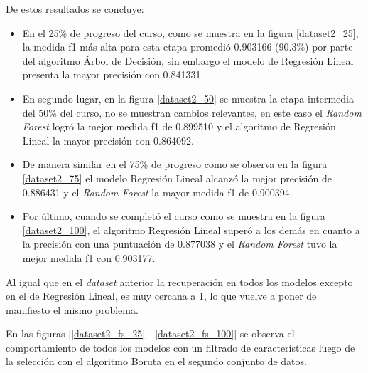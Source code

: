 De estos resultados se concluye:  
\begin{itemize}
    \item En el 25\% de progreso del curso, como se muestra en la figura \ref{dataset2_25}, la medida f1 más alta para 
    esta etapa promedió 0.903166 (90.3\%) por parte del algoritmo Árbol de Decisión, sin embargo el modelo de Regresión Lineal presenta la mayor precisión con 0.841331.
    \item En segundo lugar, en la figura \ref{dataset2_50} se muestra la etapa intermedia del 50\% del curso, no se muestran cambios relevantes, en este caso el \textit{Random Forest} logró la mejor medida f1 de 0.899510 y el algoritmo de Regresión Lineal la mayor precisión con 0.864092. 
    \item De manera similar en el 75\% de progreso como se observa en la figura \ref{dataset2_75} el modelo Regresión Lineal alcanzó la mejor precisión de 0.886431 y el \textit{Random Forest} la mayor medida f1 de 0.900394. 
    \item Por último, cuando se completó el curso como se muestra en la figura \ref{dataset2_100}, el algoritmo Regresión Lineal superó a los demás en cuanto a la precisión con una puntuación de 0.877038 y el \textit{Random Forest} tuvo la mejor medida f1 con 0.903177. 
\end{itemize}

Al igual que en el \textit{dataset} anterior la recuperación en todos los modelos excepto en el de Regresión Lineal, es muy cercana a 1, lo que vuelve a poner de manifiesto el mismo problema.

En las figuras [\ref{dataset2_fs_25} - \ref{dataset2_fs_100}] se observa el comportamiento de todos los modelos con un filtrado de características luego de la selección con el algoritmo Boruta en el segundo conjunto de datos.

